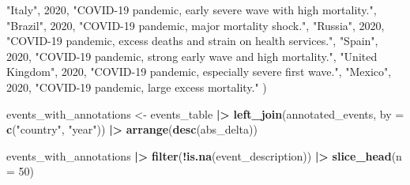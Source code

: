 \documentclass[
  11pt,
]{article}
\newenvironment{Shaded}{\begin{snugshade}}{\end{snugshade}}
\newcommand{\AttributeTok}[1]{\textcolor[rgb]{0.13,0.29,0.53}{#1}}
\newcommand{\DecValTok}[1]{\textcolor[rgb]{0.00,0.00,0.81}{#1}}
\newcommand{\FunctionTok}[1]{\textcolor[rgb]{0.13,0.29,0.53}{\textbf{#1}}}
\newcommand{\NormalTok}[1]{#1}
\newcommand{\OtherTok}[1]{\textcolor[rgb]{0.56,0.35,0.01}{#1}}
\newcommand{\SpecialCharTok}[1]{\textcolor[rgb]{0.81,0.36,0.00}{\textbf{#1}}}
\newcommand{\StringTok}[1]{\textcolor[rgb]{0.31,0.60,0.02}{#1}}
\begin{document}
\begin{Shaded}
\begin{Highlighting}[]
  \StringTok{"Italy"}\NormalTok{, }\DecValTok{2020}\NormalTok{, }\StringTok{"COVID{-}19 pandemic, early severe wave with high mortality."}\NormalTok{,}
  \StringTok{"Brazil"}\NormalTok{, }\DecValTok{2020}\NormalTok{, }\StringTok{"COVID{-}19 pandemic, major mortality shock."}\NormalTok{,}
  \StringTok{"Russia"}\NormalTok{, }\DecValTok{2020}\NormalTok{, }\StringTok{"COVID{-}19 pandemic, excess deaths and strain on health services."}\NormalTok{,}
  \StringTok{"Spain"}\NormalTok{, }\DecValTok{2020}\NormalTok{, }\StringTok{"COVID{-}19 pandemic, strong early wave and high mortality."}\NormalTok{,}
  \StringTok{"United Kingdom"}\NormalTok{, }\DecValTok{2020}\NormalTok{, }\StringTok{"COVID{-}19 pandemic, especially severe first wave."}\NormalTok{,}
  \StringTok{"Mexico"}\NormalTok{, }\DecValTok{2020}\NormalTok{, }\StringTok{"COVID{-}19 pandemic, large excess mortality."}
\NormalTok{)}

\NormalTok{events\_with\_annotations }\OtherTok{\textless{}{-}}\NormalTok{ events\_table }\SpecialCharTok{|\textgreater{}}
  \FunctionTok{left\_join}\NormalTok{(annotated\_events, }\AttributeTok{by =} \FunctionTok{c}\NormalTok{(}\StringTok{"country"}\NormalTok{, }\StringTok{"year"}\NormalTok{)) }\SpecialCharTok{|\textgreater{}}
  \FunctionTok{arrange}\NormalTok{(}\FunctionTok{desc}\NormalTok{(abs\_delta))}

\NormalTok{events\_with\_annotations }\SpecialCharTok{|\textgreater{}} 
  \FunctionTok{filter}\NormalTok{(}\SpecialCharTok{!}\FunctionTok{is.na}\NormalTok{(event\_description)) }\SpecialCharTok{|\textgreater{}}
  \FunctionTok{slice\_head}\NormalTok{(}\AttributeTok{n =} \DecValTok{50}\NormalTok{)}


\end{Highlighting}
\end{Shaded}
\end{document}
